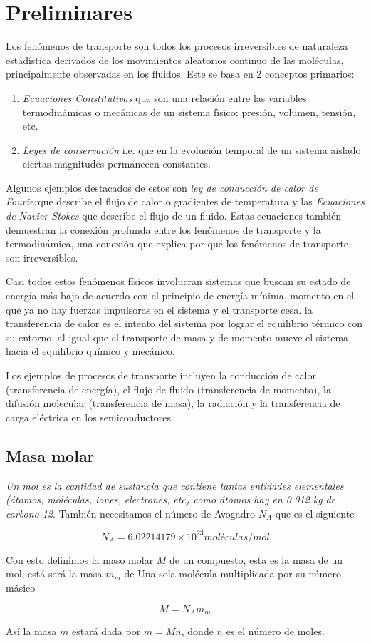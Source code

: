\newpage
\section{Preliminares}
Los fenómenos de transporte son todos los procesos irreversibles
de naturaleza estadística derivados de los movimientos aleatorios
continuo de las moléculas, principalmente observadas en los
fluidos. Este se basa en 2 conceptos primarios:

\begin{enumerate}
    \item \textit{Ecuaciones Constitutivas} que son una relación
    entre las variables termodinámicas o mecánicas de un
    sistema físico: presión, volumen, tensión, etc.
    \item \textit{Leyes de conservación} i.e. 
    que en la evolución temporal de un sistema aislado ciertas
    magnitudes permanecen constantes.
\end{enumerate}

Algunos ejemplos destacados de estos son \textit{ley de conducción
de calor de Fourier}que describe el flujo de calor o gradientes
de temperatura y las \textit{Ecuaciones de Navier-Stokes} que
describe el flujo de un fluido. Estas ecuaciones también
demuestran la conexión profunda entre los fenómenos de transporte
y la termodinámica, una conexión que explica por qué los fenómenos
de transporte son irreversibles.

Casi todos estos fenómenos físicos involucran sistemas que buscan
su estado de energía más bajo de acuerdo con el principio de
energía mínima, momento en el que ya no hay fuerzas impulsoras
en el sistema y el transporte cesa. 
la transferencia de calor es el intento del sistema por lograr el
equilibrio térmico con su entorno, al igual que el transporte de
masa y de momento mueve el sistema hacia el equilibrio químico y
mecánico.

Los ejemplos de procesos de transporte incluyen la conducción de
calor (transferencia de energía), el flujo de fluido (transferencia
de momento), la difusión molecular (transferencia de masa),
la radiación y la transferencia de carga eléctrica en los
semiconductores.

\subsection{Masa molar}
\textit{Un mol es la cantidad
de sustancia que contiene tantas entidades elementales (átomos, moléculas, iones, electrones, etc)
como átomos hay en 0.012 kg de carbono 12}. También necesitamos
el número de Avogadro $N_A$ que es el siguiente

\begin{equation*}
    N_A = 6.02214179\times 10^{23} \unit{moléculas/mol}
\end{equation*}

Con esto definimos la maso molar $M$ de un compuesto,
esta es la masa de un mol, está será la masa $m_m$ de Una sola molécula
multiplicada por su número másico

\begin{equation}
    M = N_A m_m
\end{equation}

Así la masa $m$ estará dada por $m = M n$, donde $n$
es el número de moles.